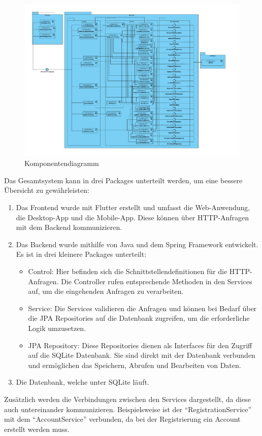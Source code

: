 \begin{figure}[H]
    \centering
    \includegraphics[width = \textwidth]{pictures/fastlane_komponentendiagramm}
    \caption{Komponentendiagramm}
    \label{fig:komponentendiagramm}
\end{figure}
\clearpage
Das Gesamtsystem kann in drei Packages unterteilt werden, um eine bessere Übersicht zu gewährleisten:
\begin{enumerate}
    \item Das Frontend wurde mit Flutter erstellt und umfasst die Web-Anwendung, die Desktop-App und die Mobile-App.
    Diese können über HTTP-Anfragen mit dem Backend kommunizieren.
    \item Das Backend wurde mithilfe von Java und dem Spring Framework entwickelt.
    Es ist in drei kleinere Packages unterteilt:
    \begin{itemize}
        \item Control: Hier befinden sich die Schnittstellendefinitionen für die HTTP-Anfragen.
        Die Controller rufen entsprechende Methoden in den Services auf, um die eingehenden Anfragen zu verarbeiten.
        \item Service: Die Services validieren die Anfragen und können bei Bedarf über die JPA Repositories
        auf die Datenbank zugreifen, um die erforderliche Logik umzusetzen.
        \item JPA Repository: Diese Repositories dienen als Interfaces für den Zugriff auf die SQLite Datenbank.
        Sie sind direkt mit der Datenbank verbunden und ermöglichen das Speichern, Abrufen und Bearbeiten von Daten.
    \end{itemize}
    \item Die Datenbank, welche unter SQLite läuft.
\end{enumerate}

Zusätzlich werden die Verbindungen zwischen den Services dargestellt, da diese auch untereinander kommunizieren.
Beispielsweise ist der \enquote{RegistrationService} mit dem \enquote{AccountService} verbunden, da bei der
Registrierung ein Account erstellt werden muss.